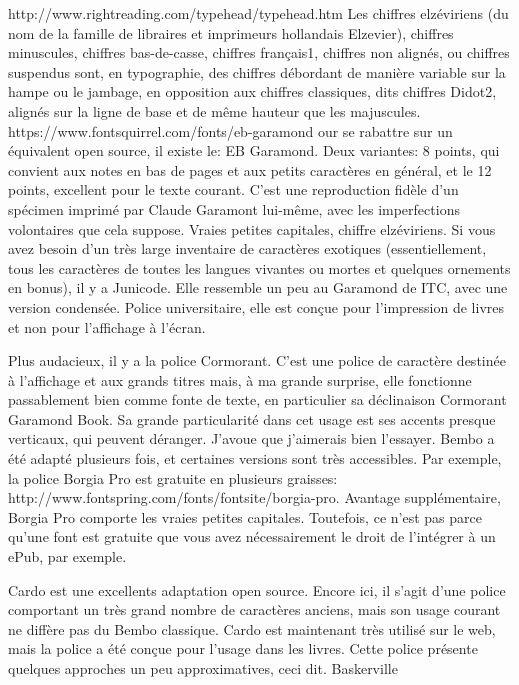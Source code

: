 \documentclass[12pt,a4paper,twocolumn]{book} %
\begin{document}
http://www.rightreading.com/typehead/typehead.htm
Les chiffres elzéviriens (du nom de la famille de libraires et imprimeurs hollandais Elzevier), chiffres minuscules, chiffres bas-de-casse, chiffres français1, chiffres non alignés, ou chiffres suspendus sont, en typographie, des chiffres débordant de manière variable sur la hampe ou le jambage, en opposition aux chiffres classiques, dits chiffres Didot2, alignés sur la ligne de base et de même hauteur que les majuscules.
https://www.fontsquirrel.com/fonts/eb-garamond
our se rabattre sur un équivalent open source, il existe le: EB Garamond. Deux variantes: 8 points, qui convient aux notes en bas de pages et aux petits caractères en général, et le 12 points, excellent pour le texte courant. C’est une reproduction fidèle d’un spécimen imprimé par Claude Garamont lui-même, avec les imperfections volontaires que cela suppose. Vraies petites capitales, chiffre elzéviriens.
Si vous avez besoin d’un très large inventaire de caractères exotiques (essentiellement, tous les caractères de toutes les langues vivantes ou mortes et quelques ornements en bonus), il y a Junicode. Elle ressemble un peu au Garamond de ITC, avec une version condensée. Police universitaire, elle est conçue pour l’impression de livres et non pour l’affichage à l’écran.

Plus audacieux, il y a la police Cormorant. C’est une police de caractère destinée à l’affichage et aux grands titres mais, à ma grande surprise, elle fonctionne passablement bien comme fonte de texte, en particulier sa déclinaison Cormorant Garamond Book. Sa grande particularité dans cet usage est ses accents presque verticaux, qui peuvent déranger. J’avoue que j’aimerais bien l’essayer.
Bembo a été adapté plusieurs fois, et certaines versions sont très accessibles. Par exemple, la police Borgia Pro est gratuite en plusieurs graisses: http://www.fontspring.com/fonts/fontsite/borgia-pro. Avantage supplémentaire, Borgia Pro comporte les vraies petites capitales. Toutefois, ce n’est pas parce qu’une font est gratuite que vous avez nécessairement le droit de l’intégrer à un ePub, par exemple.

Cardo est une excellents adaptation open source. Encore ici, il s’agit d’une police comportant un très grand nombre de caractères anciens, mais son usage courant ne diffère pas du Bembo classique. Cardo est maintenant très utilisé sur le web, mais la police a été conçue pour l’usage dans les livres. Cette police présente quelques approches un peu approximatives, ceci dit.
Baskerville
\end{document}
